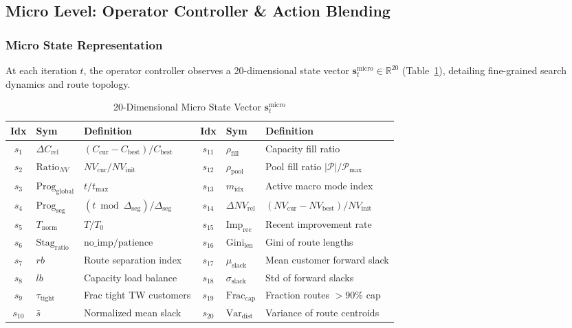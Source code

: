 \documentclass{ieeeaccess}
\begin{document}
\subsection{Micro Level: Operator Controller \& Action Blending}
\label{sec:micro_controller}

\subsubsection{Micro State Representation}
At each iteration $t$, the operator controller observes a 20-dimensional state vector $\mathbf{s}_t^{\text{micro}} \in \mathbb{R}^{20}$ (Table~\ref{tab:micro_state}), detailing fine-grained search dynamics and route topology.

\begin{table}[!b]
\caption{20-Dimensional Micro State Vector $\mathbf{s}_t^{\text{micro}}$}
\label{tab:micro_state}
\centering
\scriptsize
\setlength{\tabcolsep}{1.2pt}
\begin{tabularx}{\columnwidth}{clX clX}
\toprule
\textbf{Idx} & \textbf{Sym} & \textbf{Definition} & \textbf{Idx} & \textbf{Sym} & \textbf{Definition} \\
\midrule
$s_1$ & $\Delta C_{\text{rel}}$ & $(C_{\text{cur}}\!-\!C_{\text{best}})/C_{\text{best}}$ & $s_{11}$ & $\rho_{\text{fill}}$ & Capacity fill ratio \\
$s_2$ & $\text{Ratio}_{NV}$ & $NV_{\text{cur}}/NV_{\text{init}}$ & $s_{12}$ & $\rho_{\text{pool}}$ & Pool fill ratio $|\mathcal{P}|/\mathcal{P}_{\max}$ \\
$s_3$ & $\text{Prog}_{\text{global}}$ & $t / t_{\max}$ & $s_{13}$ & $m_{\text{idx}}$ & Active macro mode index \\
$s_4$ & $\text{Prog}_{\text{seg}}$ & $(t \bmod \Delta_{\text{seg}})/\Delta_{\text{seg}}$ & $s_{14}$ & $\Delta NV_{\text{rel}}$ & $(NV_{\text{cur}}\!-\!NV_{\text{best}})/NV_{\text{init}}$ \\
$s_5$ & $T_{\text{norm}}$ & $T / T_0$ & $s_{15}$ & $\text{Imp}_{\text{rec}}$ & Recent improvement rate \\
$s_6$ & $\text{Stag}_{\text{ratio}}$ & $\text{no\_imp} / \text{patience}$ & $s_{16}$ & $\text{Gini}_{\text{len}}$ & Gini of route lengths \\
$s_7$ & $rb$ & Route separation index & $s_{17}$ & $\mu_{\text{slack}}$ & Mean customer forward slack \\
$s_8$ & $lb$ & Capacity load balance & $s_{18}$ & $\sigma_{\text{slack}}$ & Std of forward slacks \\
$s_9$ & $\tau_{\text{tight}}$ & Frac tight TW customers & $s_{19}$ & $\text{Frac}_{\text{cap}}$ & Fraction routes $>90\%$ cap \\
$s_{10}$ & $\bar{s}$ & Normalized mean slack & $s_{20}$ & $\text{Var}_{\text{dist}}$ & Variance of route centroids \\
\bottomrule
\end{tabularx}
\end{table}
\end{document}
